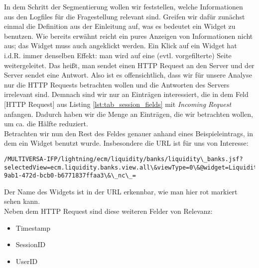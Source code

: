 In dem Schritt der Segmentierung wollen wir feststellen, welche Informationen aus den Logfiles für die Fragestellung relevant sind. Greifen wir dafür zunächst einmal die Definition aus der Einleitung auf, was es bedeutet ein Widget zu benutzen. Wie bereits erwähnt reicht ein pures Anzeigen von Informationen nicht aus; das Widget muss auch angeklickt werden. Ein Klick auf ein Widget hat i.d.R. immer denselben Effekt: man wird auf eine (evtl. vorgefilterte) Seite weitergeleitet. Das heißt, man sendet einen HTTP Request an den Server und der Server sendet eine Antwort. Also ist es offensichtlich, dass wir für unsere Analyse nur die HTTP Requests betrachten wollen und die Antworten des Servers irrelevant sind. Demnach sind wir nur an Einträgen interessiert, die in dem Feld [HTTP Request] aus Listing \ref{lst:tab_session_fields} mit \textit{Incoming Request} anfangen. Dadurch haben wir die Menge an Einträgen, die wir betrachten wollen, um ca. die Hälfte reduziert.\\
Betrachten wir nun den Rest des Feldes genauer anhand eines Beispieleintrags, in dem ein Widget benutzt wurde. Insbesondere die URL ist für uns von Interesse:\\
\begin{lstlisting}[style=base,numbers=none,caption = Beispiel URL,captionpos=b,label=lst:url-beispiel]
/MULTIVERSA-IFP/lightning/ecm/liquidity/banks/liquidity\_banks.jsf?selectedView=ecm.liquidity.banks.view.all\&viewType=0\&@widget=LiquidityByBanksWidgetContent@\&banks=RpBLVhy85c5u4nGKeISH0A\&conversationContext=3\&\_ns\_=f63a91bc-9ab1-472d-bcb0-b6771837ffaa3\&\_nc\_=
\end{lstlisting}
Der Name des Widgets ist in der URL erkennbar, wie man hier rot markiert sehen kann.\\
Neben dem HTTP Request sind diese weiteren Felder von Relevanz:\\
\begin{itemize}
	\item Timestamp
	\item SessionID
	\item UserID
\end{itemize}

